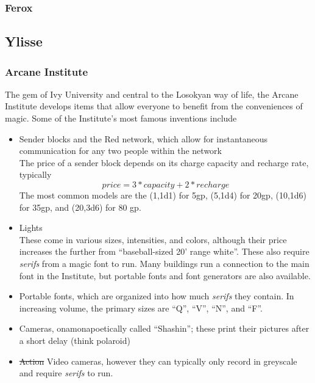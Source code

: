 \subsubsection{Ferox}
\label{places:ferox}

\subsection{Ylisse}
\label{nations:ylisse}

\subsubsection{Arcane Institute}
\label{places:arcaneinstitute}
The gem of Ivy University and central to the Losokyan way of life, the Arcane Institute develops items that allow everyone to benefit from the conveniences of magic. Some of the Institute's most famous inventions include
\begin{itemize}
\item Sender blocks and the Red network, which allow for instantaneous communication for any two people within the network\\
The price of a sender block depends on its charge capacity and recharge rate, typically
\[ price = 3 * capacity + 2*recharge \]
The most common models are the (1,1d1) for 5gp, (5,1d4) for 20gp, (10,1d6) for 35gp, and (20,3d6) for 80 gp. 
\item Lights\\
These come in various sizes, intensities, and colors, although their price increases the further from ``baseball-sized 20' range white''. These also require \textit{serifs} from a magic font to run. Many buildings run a connection to the main font in the Institute, but portable fonts and font generators are also available.
\item Portable fonts, which are organized into how much \textit{serifs} they contain. In increasing volume, the primary sizes are ``Q'', ``V'', ``N'', and ``F''. 
\item Cameras, onamonapoetically called ``Shashin''; these print their pictures after a short delay (think polaroid)
\item \st{Action} Video cameras, however they can typically only record in greyscale and require \textit{serifs} to run.
\end{itemize}

